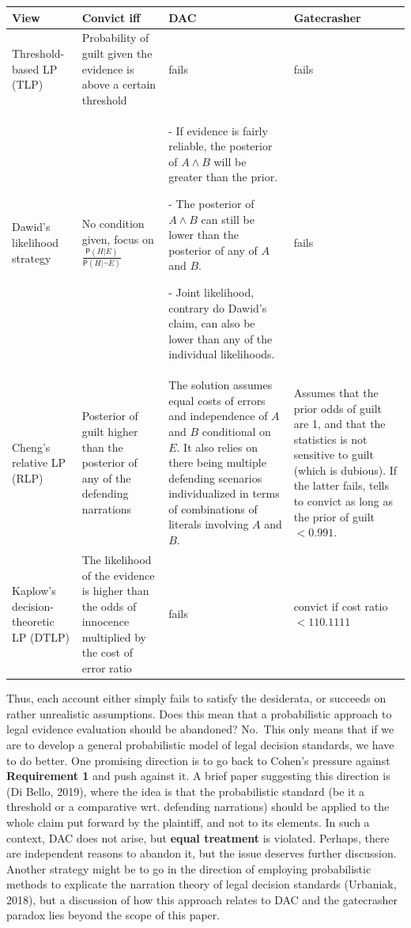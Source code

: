 \documentclass[
  10pt,
  dvipsnames,enabledeprecatedfontcommands]{scrartcl}
\newcommand{\n}{\neg}
\newcommand{\et}{\wedge}
\newcommand{\pr}[1]{\mathsf{P}(#1)}
\begin{document}
\begin{center}
\footnotesize 
 \begin{tabular}{@{}p{3cm}p{2.5cm}p{4cm}p{3cm}@{}}
\toprule
\textbf{View} & \textbf{Convict iff} & \textbf{DAC} & \textbf{Gatecrasher} \\ \midrule
Threshold-based LP (TLP) & Probability of guilt given the evidence is above a certain threshold & fails & fails \\
Dawid's likelihood strategy & No condition given, focus on $\frac{\pr{H\vert E}}{\pr{H\vert \n E}}$ & - If evidence is fairly reliable, the posterior of $A\et B$ will be greater than the prior.

- The posterior of $A\et B$ can still be lower than the posterior of any of $A$ and $B$.

- Joint likelihood, contrary do Dawid's claim, can also be lower than any of the individual likelihoods. & fails  \\
Cheng's relative LP (RLP)
& Posterior of guilt higher than the posterior of any of the defending narrations & The solution assumes equal costs of errors and independence of $A$ and $B$ conditional on $E$. It also relies on there being multiple defending scenarios individualized in terms of  combinations of literals involving $A$ and $B$. & Assumes that the prior odds of guilt are 1, and that the statistics is not sensitive to guilt (which is dubious). If the latter fails, tells to convict as long as the prior of guilt $<0.991$. \\
Kaplow's decision-theoretic LP (DTLP) &
The likelihood of the evidence is higher than the odds of innocence multiplied by the cost of error ratio & fails & convict if cost ratio $<110.1111$
\end{tabular} 
 \end{center}

Thus, each account either simply fails to satisfy the desiderata, or
succeeds on rather unrealistic assumptions. Does this mean that a
probabilistic approach to legal evidence evaluation should be abandoned?
No.~This only means that if we are to develop a general probabilistic
model of legal decision standards, we have to do better. One promising
direction is to go back to Cohen's pressure against
\textbf{Requirement 1} and push against it. A brief paper suggesting
this direction is (Di Bello, 2019), where the idea is that the
probabilistic standard (be it a threshold or a comparative wrt.
defending narrations) should be applied to the whole claim put forward
by the plaintiff, and not to its elements. In such a context, DAC does
not arise, but \textbf{equal treatment} is violated. Perhaps, there are
independent reasons to abandon it, but the issue deserves further
discussion. Another strategy might be to go in the direction of
employing probabilistic methods to explicate the narration theory of
legal decision standards (Urbaniak, 2018), but a discussion of how this
approach relates to DAC and the gatecrasher paradox lies beyond the
scope of this paper.
\end{document}
